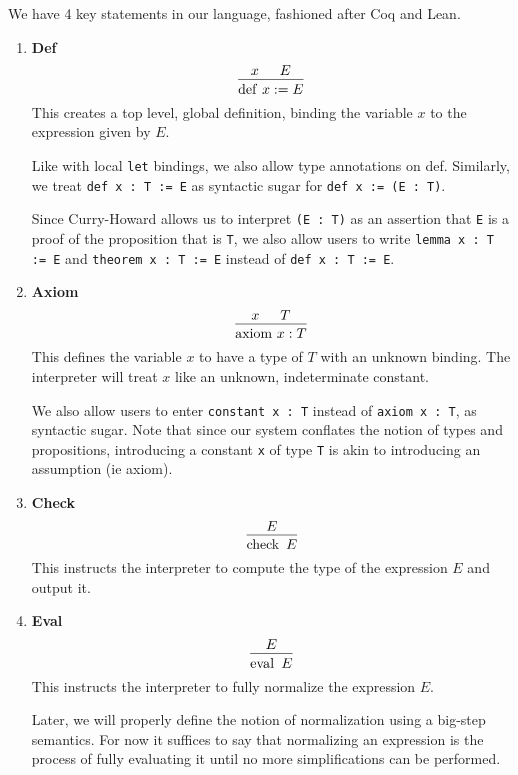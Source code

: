 \documentclass{article}
\begin{document}
We have 4 key statements in our language, fashioned after Coq and Lean.

\begin{enumerate}
\item \textbf{Def} \\
\[
  \begin{prooftree}
    \hypo{x}
    \hypo{E}
    \infer2{\deff \, x := E}
  \end{prooftree}
\]
This creates a top level, global definition, binding the variable $x$ to the
expression given by $E$.

Like with local \verb|let| bindings, we also allow type annotations on def.
Similarly, we treat \verb|def x : T := E| as syntactic sugar for
\verb|def x := (E : T)|.

Since Curry-Howard allows us to interpret \verb|(E : T)| as an assertion
that \verb|E| is a proof of the proposition that is \verb|T|, we also allow
users to write \verb|lemma x : T := E| and \verb|theorem x : T := E| instead of
\verb|def x : T := E|.

\item \textbf{Axiom} \\
\[
  \begin{prooftree}
    \hypo{x}
    \hypo{T}
    \infer2{\axiom \, x : T}
  \end{prooftree}
\]
This defines the variable $x$ to have a type of $T$ with an unknown binding.
The interpreter will treat $x$ like an unknown, indeterminate constant.

We also allow users to enter \verb|constant x : T| instead of \verb|axiom x : T|,
as syntactic sugar. Note that since our system conflates the notion of types and
propositions, introducing a constant \verb|x| of type \verb|T| is akin to
introducing an assumption (ie axiom).

\item \textbf{Check} \\
\[
  \begin{prooftree}
    \hypo{E}
    \infer1{\checkk \,\, E}
  \end{prooftree}
\]
This instructs the interpreter to compute the type of the expression $E$ and
output it.

\item \textbf{Eval} \\
\[
  \begin{prooftree}
    \hypo{E}
    \infer1{\evall \,\, E}
  \end{prooftree}
\]
This instructs the interpreter to fully normalize the expression $E$.

Later, we will properly define the notion of normalization using a
big-step semantics. For now it suffices to say that normalizing an expression
is the process of fully evaluating it until no more simplifications can be
performed.

\end{enumerate}
\end{document}
